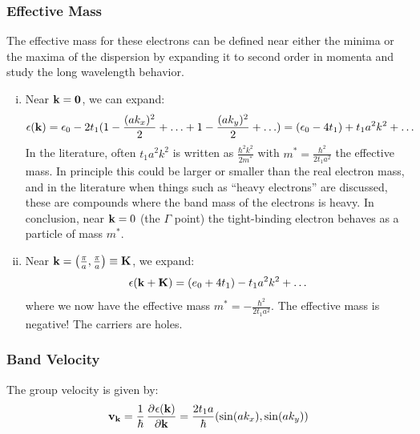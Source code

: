 \subsubsection{Effective Mass}
The effective mass for these electrons can be defined near either the minima or the maxima of the dispersion by expanding it to second order in momenta and study the long wavelength behavior.
\begin{enumerate}[(i)]
    \item Near $\mathbf{k} = \mathbf{0}$, we can expand:
    \begin{equation}
        \epsilon(\mathbf{k}) = \epsilon_0 - 2t_1(1 - \frac{(ak_x)^2}{2} + \ldots + 1 - \frac{(ak_y)^2}{2} + \ldots) = (\epsilon_0 - 4t_1) + t_1a^2k^2 + \ldots 
    \end{equation}
    In the literature, often $t_1a^2k^2$ is written as $\frac{\hbar^2 k^2}{2m^*}$ with $m^* = \frac{\hbar^2}{2t_1a^2}$ the effective mass. In principle this could be larger or smaller than the real electron mass, and in the literature when things such as ``heavy electrons'' are discussed, these are compounds where the band mass of the electrons is heavy. In conclusion, near $\mathbf{k} = 0$ (the $\Gamma$ point) the tight-binding electron behaves as a particle of mass $m^*$.

    \item Near $\mathbf{k} = \left(\frac{\pi}{a}, \frac{\pi}{a}\right) \equiv \mathbf{K}$, we expand:
    \begin{equation}
        \epsilon(\mathbf{k} + \mathbf{K}) = (e_0 + 4t_1) - t_1a^2k^2 + \ldots
    \end{equation}
    where we now have the effective mass $m^* = -\frac{\hbar^2}{2t_1 a^2}$. The effective mass is negative! The carriers are holes.
\end{enumerate}

\subsubsection{Band Velocity}
The group velocity is given by:
\begin{equation}
    \v{v}_\v{k} = \frac{1}{\hbar}\dpd{\e(\v{k})}{\v{k}} = \frac{2t_1a}{\hbar}(\sin(ak_x), \sin(ak_y))
\end{equation}

